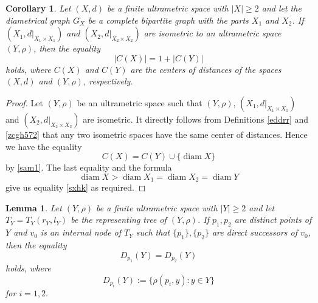 \documentclass[pdflatex,sn-mathphys-num]{sn-jnl}%
\theoremstyle{thmstyleone}%
\newtheorem{Lemma}[Theorem]{Lemma}
\newtheorem{Corollary}[Theorem]{Corollary}
\theoremstyle{thmstyletwo}%
\theoremstyle{thmstylethree}%
\theoremstyle{thmstyletwo}%
\theoremstyle{thmstylethree}%
\begin{document}
\begin{Corollary}\label{kgdzw}
Let $(X,d)$ be a finite ultrametric space with $|X|\ge 2$ and let the diametrical graph $G_X$ be a complete bipartite graph with the parts $X_1$ and $X_2$. If $(X_1,d|_{X_1\times X_1})$ and $(X_2,d|_{X_2\times X_2})$ are isometric to an ultrametric space $(Y,\rho)$, then the equality
\begin{equation}
    \label{sxhk}
|C(X)| = 1 + |C(Y)|
\end{equation}
holds, where $C(X)$ and $C(Y)$ are the centers of distances of the spaces $(X,d)$ and $(Y,\rho)$, respectively.
\end{Corollary}

\begin{proof}
Let $(Y,\rho)$ be an ultrametric space such that $(Y,\rho)$, $(X_1,d|_{X_1\times X_1})$ and $(X_2,d|_{X_2\times X_2})$ are isometric. It directly follows from Definitions \ref{eddrr} and \ref{zcgh572} that any two isometric spaces have the same center of distances.
 Hence we have the equality
\[
C(X) = C(Y) \cup \{ \operatorname{diam} X \}
\]
by \eqref{sam1}.
The last equality and the formula 
\begin{equation*}
    \operatorname{diam} X > \operatorname{diam} X_1=\operatorname{diam}X_2= \operatorname{diam} Y
\end{equation*}
give us equality \eqref{sxhk} as required. 
\end{proof}





\begin{Lemma}\label{sabra}
Let $(Y,\rho)$ be a finite ultrametric space with $|Y|\ge 2$ and let $T_Y=T_Y(r_Y,l_Y)$ be the representing tree of $(Y,\rho)$. If $p_1,p_2$ are distinct points of $Y$ and $v_0$ is an internal node of $T_Y$ such that $\{p_1\},\{p_2\}$ are direct successors of $v_0$, then the equality
\begin{equation}
\label{kar1}
D_{p_1}(Y)=D_{p_2}(Y)
\end{equation}
holds, where
\[
D_{p_i}(Y):=\{\rho(p_i,y):y\in Y\} 
\]
for $i=1,2.$
\end{Lemma}
\end{document}
